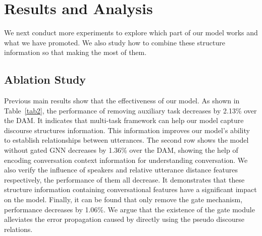\documentclass[11pt]{article}
\begin{document}
\section{Results and Analysis}\label{sec:results}
We next conduct more experiments to explore which part of our model works and what we have promoted.
We also study how to combine these structure information so that making the most of them.

\subsection{Ablation Study}

\begin{table}
    \centering
    \caption{\label{tab2}Ablation results. ``W/O'' represents ``without"}
\end{table}
Previous main results show that the effectiveness of our model.
As shown in Table~\ref{tab2}, the performance of removing auxiliary task decreases by 2.13\% over the DAM.
It indicates that multi-task framework can help our model capture discourse structures information.
This information improves our model's ability to establish relationships between utterances.
The second row shows the model without gated GNN decreases by 1.36\% over the DAM, showing the help of encoding conversation context information for understanding conversation.
We also verify the influence of speakers and relative utterance distance features respectively, the performance of them all decrease.
It demonstrates that these structure information containing conversational features have a significant impact on the model. 
Finally, it can be found that only remove the gate mechanism, performance decreases by 1.06\%.
We argue that the existence of the gate module alleviates the error propagation caused by directly using the pseudo discourse relations.
\end{document}
